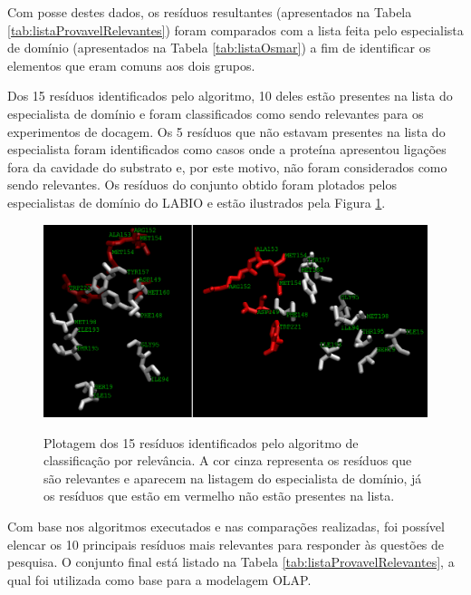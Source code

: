 Com posse destes dados, os resíduos resultantes (apresentados na Tabela \ref{tab:listaProvavelRelevantes}) foram comparados com a lista feita pelo especialista de domínio (apresentados na Tabela \ref{tab:listaOsmar}) a fim de identificar os elementos que eram comuns aos dois grupos. 

Dos 15 resíduos identificados pelo algoritmo, 10 deles estão presentes na lista do especialista de domínio e foram classificados como sendo relevantes para os experimentos de docagem. Os 5 resíduos que não estavam presentes na lista do especialista foram identificados como casos onde a proteína apresentou ligações fora da cavidade do substrato e, por este motivo, não foram considerados como sendo relevantes. Os resíduos do conjunto obtido foram plotados pelos especialistas de domínio do LABIO e estão ilustrados pela Figura \ref{fig:PlotResiduos}. 

\begin{figure}[h]
        \center
        \includegraphics[scale=0.55]{images/avaliacao_Residuos_nomes.png}
        \label{fig:PlotResiduos}
        \caption{Plotagem dos 15 resíduos identificados pelo algoritmo de classificação por relevância. A cor cinza representa os resíduos que são relevantes e aparecem na listagem do especialista de domínio, já os resíduos que estão em vermelho não estão presentes na lista.}
\end{figure}

Com base nos algoritmos executados e nas comparações realizadas, foi possível elencar os 10 principais resíduos mais relevantes para responder às questões de pesquisa. O conjunto final está listado na Tabela \ref{tab:listaProvavelRelevantes}, a qual foi utilizada como base para a modelagem OLAP.

